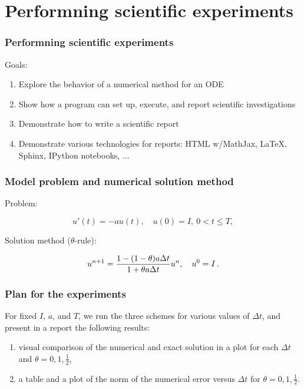 \documentclass{beamer}
\begin{document}
\section{Performning scientific experiments}

\begin{frame}
\frametitle{Performning scientific experiments}

\label{decay:experiments}

 

Goals:

\begin{enumerate}
\item Explore the behavior of a numerical method for an ODE

\item Show how a program can set up, execute, and report scientific investigations

\item Demonstrate how to write a scientific report

\item Demonstrate various technologies for reports: HTML w/MathJax, {\LaTeX}, Sphinx, IPython notebooks, ...
\end{enumerate}

\noindent

\end{frame}

\begin{frame}
\frametitle{Model problem and numerical solution method}

Problem:

\begin{equation}
u'(t) = -au(t),\quad u(0)=I,\ 0< t \leq T,
\label{decay:experiments:model}
\end{equation}

Solution method ($\theta$-rule):

\[
u^{n+1} = \frac{1 - (1-\theta) a\Delta t}{1 + \theta a\Delta t}u^n,
\quad u^0=I\thinspace .
\]
\end{frame}

\begin{frame}
\frametitle{Plan for the experiments}

For fixed $I$, $a$, and $T$, we run the three schemes for various
values of $\Delta t$, and present in a report the following results:

\begin{enumerate}
\item visual comparison of the numerical and exact solution in a plot for
   each $\Delta t$ and $\theta=0,1,\frac{1}{2}$,

\item a table and a plot of the norm of the numerical error versus $\Delta t$
   for $\theta=0,1,\frac{1}{2}$.
\end{enumerate}

\noindent
\end{frame}
\end{document}
